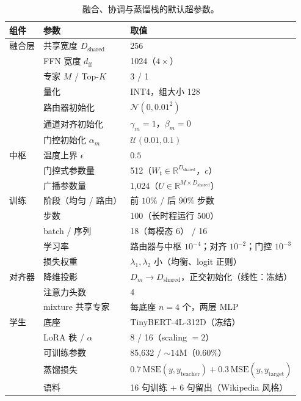 \documentclass[10pt,twoside]{article}
\newcommand{\R}{\mathbb{R}}
\theoremstyle{definition}
\theoremstyle{plain}
\theoremstyle{remark}
\begin{document}
\begin{table}[h]
\centering
\caption{融合、协调与蒸馏栈的默认超参数。}
\small
\begin{tabular}{lll}
\toprule
\textbf{组件} & \textbf{参数} & \textbf{取值} \\
\midrule
融合层 & 共享宽度 $D_{\text{shared}}$ & 256 \\
 & FFN 宽度 $d_{\text{ff}}$ & 1024（$4\times$） \\
 & 专家 $M$ / Top-$K$ & 3 / 1 \\
 & 量化 & INT4，组大小 128 \\
 & 路由器初始化 & $\mathcal{N}(0, 0.01^2)$ \\
 & 通道对齐初始化 & $\gamma_m = 1$，$\beta_m = 0$ \\
 & 门控初始化 $\alpha_m$ & $\mathcal{U}(0.01, 0.1)$ \\
\midrule
中枢 & 温度上界 $\epsilon$ & $0.5$ \\
 & 门控式参数量 & 512（$W_t \in \R^{D_{\text{shared}}}$，$c$） \\
 & 广播参数量 & 1{,}024（$U \in \R^{M \times D_{\text{shared}}}$） \\
\midrule
训练 & 阶段（均匀 / 路由） & 前 $10\%$ / 后 $90\%$ 步数 \\
 & 步数 & 100（长时程运行 500） \\
 & batch / 序列 & 18（每模态 6） / 16 \\
 & 学习率 & 路由器与中枢 $10^{-4}$；对齐 $10^{-2}$；门控 $10^{-3}$ \\
 & 损失权重 & $\lambda_1, \lambda_2$ 小（均衡、logit 正则） \\
\midrule
对齐器 & 降维投影 & $D_m \rightarrow D_{\text{shared}}$，正交初始化（线性：冻结） \\
 & 注意力头数 & 4 \\
 & mixture 共享专家 & 每底座 $n = 4$ 个，两层 MLP \\
\midrule
学生 & 底座 & TinyBERT-4L-312D（冻结） \\
 & LoRA 秩 / $\alpha$ & 8 / 16（scaling $= 2$） \\
 & 可训练参数 & 85{,}632 / ${\sim}14$M（$0.60\%$） \\
 & 蒸馏损失 & $0.7\,\mathrm{MSE}(y, y_{\text{teacher}}) + 0.3\,\mathrm{MSE}(y, y_{\text{target}})$ \\
 & 语料 & 16 句训练 + 6 句留出（Wikipedia 风格） \\
\bottomrule
\end{tabular}
\end{table}
\end{document}
